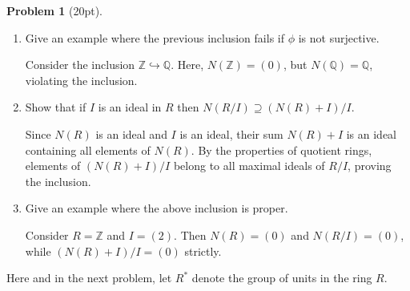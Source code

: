 \documentclass[12pt]{article}
\theoremstyle{definition}
\newtheorem{problem}{Problem}
\begin{document}
\begin{problem}[20pt]
\begin{enumerate}[label=\arabic*.]
            \item Give an example where the previous inclusion fails if $\phi$ is not surjective.
            
            \begin{solution}
            Consider the inclusion $\mathbb{Z} \hookrightarrow \mathbb{Q}$. Here, $N(\mathbb{Z}) = (0)$, but $N(\mathbb{Q}) = \mathbb{Q}$, violating the inclusion.
            \end{solution}

            \item Show that if $I$ is an ideal in $R$ then $N(R/I) \supseteq (N(R) + I)/I$.
            
            \begin{solution}
            Since $N(R)$ is an ideal and $I$ is an ideal, their sum $N(R) + I$ is an ideal containing all elements of $N(R)$. By the properties of quotient rings, elements of $(N(R) + I)/I$ belong to all maximal ideals of $R/I$, proving the inclusion.
            \end{solution}

            \item Give an example where the above inclusion is proper.
            
            \begin{solution}
            Consider $R = \mathbb{Z}$ and $I = (2)$. Then $N(R) = (0)$ and $N(R/I) = (0)$, while $(N(R) + I)/I = (0)$ strictly.
            \end{solution}
      \end{enumerate}
      Here and in the next problem, let $R^*$ denote the group of units in the ring $R$.
\end{problem}
\end{document}
